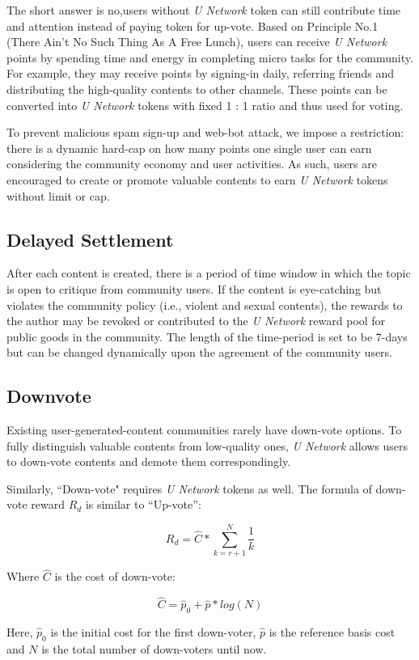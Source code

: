 The short answer is no,users without \emph{U Network}  token can still contribute time and attention instead of paying token for up-vote. Based on Principle No.1 (There Ain't No Such Thing As A Free Lunch), users can receive \emph{U Network}  points by spending time and energy in completing micro tasks for the community. For example, they may receive points by signing-in daily, referring friends and distributing the high-quality contents to other channels. These points can be converted into \emph{U Network}  tokens with fixed 1 : 1 ratio and thus used for voting.  

To prevent malicious spam sign-up and web-bot attack, we impose a restriction: there is a dynamic hard-cap on how many points one single user can earn considering the community economy and user activities. As such, users are encouraged to create or promote valuable contents to earn \emph{U Network} tokens without limit or cap. 

\subsection{Delayed Settlement}
After each content is created, there is a period of time window in which the topic is open to critique from community users. If the content is eye-catching but violates the community policy (i.e., violent and sexual contents), the rewards to the author may be revoked or contributed to the \emph{U Network} reward pool for public goods in the community. The length of the time-period is set to be 7-days but can be changed dynamically upon the agreement of the community users.

\subsection{Downvote}
Existing user-generated-content communities rarely have down-vote options. To fully distinguish valuable contents from low-quality ones, \emph{U Network} allows users to down-vote contents and demote them correspondingly.

Similarly, ``Down-vote" requires \emph{U Network} tokens as well. The formula of down-vote reward $R_d$ is similar to ``Up-vote'':
\begin{center}
$$R_d = \hat C * \sum_{k=r+1}^{N} \frac{1}{k}$$
\end{center}
Where $\hat C$ is the cost of down-vote:
 \begin{center}
$$\hat C = \hat p_0 + \hat p * log(N)$$
\end{center}
Here, $\hat p_0$ is the initial cost for the first down-voter, $\hat p$ is the reference basis cost and $N$ is the total number of down-voters until now. 
 
